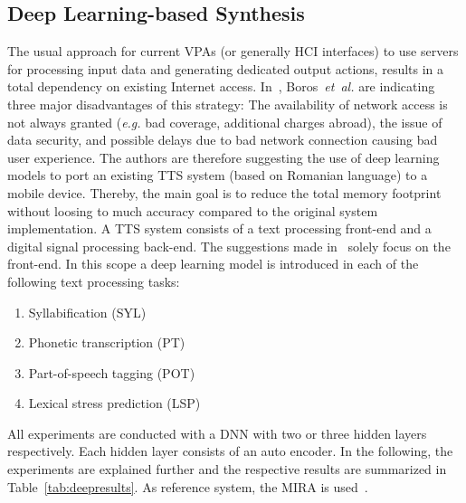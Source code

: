 \subsection{Deep Learning-based Synthesis}
\label{subsec:deepembedded}

The usual approach for current \acfp{VPA} (or generally \ac{HCI} interfaces) to use servers for processing input data and generating dedicated output actions, results in a total dependency on existing Internet access. In~\cite{boros:robust}, Boros~\textit{et~al.} are indicating three major disadvantages of this strategy: The availability of network access is not always granted (\textit{e.g.} bad coverage, additional charges abroad), the issue of data security, and possible delays due to bad network connection causing bad user experience. The authors are therefore suggesting the use of deep learning models to port an existing \ac{TTS} system (based on Romanian language) to a mobile device. Thereby, the main goal is to reduce the total memory footprint without loosing to much accuracy compared to the original system implementation. A \ac{TTS} system consists of a text processing front-end and a digital signal processing back-end. The suggestions made in~\cite{boros:robust} solely focus on the front-end. In this scope a deep learning model is introduced in each of the following text processing tasks:

\begin{enumerate}[label=\arabic*.]		%
	\parskip0.25em
	\bfseries
	\item Syllabification (SYL)
	\item Phonetic transcription (PT)
	\item Part-of-speech tagging (POT)
	\item Lexical stress prediction (LSP)
\end{enumerate}

All experiments are conducted with a \ac{DNN} with two or three hidden layers respectively. Each hidden layer consists of an auto encoder. In the following, the experiments are explained further and the respective results are summarized in Table~\ref{tab:deepresults}. As reference system, the \ac{MIRA} is used~\cite{boros:mira}.

